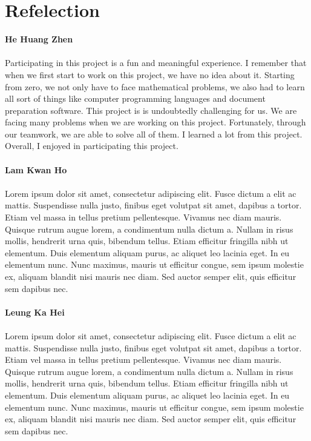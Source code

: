 \section{Refelection}
\textbf{He Huang Zhen}
\\
\\
Participating in this project is a fun and meaningful experience. I remember that when we first start to work on this project, we have no idea about it. Starting from zero, we not only have to face mathematical problems, we also had to learn all sort of things like computer programming languages and document preparation software. This project is is undoubtedly challenging for us. We are facing many problems when we are working on this project. Fortunately, through our teamwork, we are able to solve all of them. I learned a lot from this project. Overall, I enjoyed in participating this project.
\\
\\
\textbf{Lam Kwan Ho}
\\
\\
Lorem ipsum dolor sit amet, consectetur adipiscing elit. Fusce dictum a elit ac mattis. Suspendisse nulla justo, finibus eget volutpat sit amet, dapibus a tortor. Etiam vel massa in tellus pretium pellentesque. Vivamus nec diam mauris. Quisque rutrum augue lorem, a condimentum nulla dictum a. Nullam in risus mollis, hendrerit urna quis, bibendum tellus. Etiam efficitur fringilla nibh ut elementum. Duis elementum aliquam purus, ac aliquet leo lacinia eget. In eu elementum nunc. Nunc maximus, mauris ut efficitur congue, sem ipsum molestie ex, aliquam blandit nisi mauris nec diam. Sed auctor semper elit, quis efficitur sem dapibus nec.
\\
\\
\textbf{Leung Ka Hei}
\\
\\
Lorem ipsum dolor sit amet, consectetur adipiscing elit. Fusce dictum a elit ac mattis. Suspendisse nulla justo, finibus eget volutpat sit amet, dapibus a tortor. Etiam vel massa in tellus pretium pellentesque. Vivamus nec diam mauris. Quisque rutrum augue lorem, a condimentum nulla dictum a. Nullam in risus mollis, hendrerit urna quis, bibendum tellus. Etiam efficitur fringilla nibh ut elementum. Duis elementum aliquam purus, ac aliquet leo lacinia eget. In eu elementum nunc. Nunc maximus, mauris ut efficitur congue, sem ipsum molestie ex, aliquam blandit nisi mauris nec diam. Sed auctor semper elit, quis efficitur sem dapibus nec.
\\
